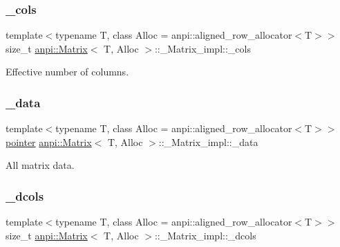 \subsubsection{\texorpdfstring{\+\_\+cols}{\_cols}}
{\footnotesize\ttfamily template$<$typename T, class Alloc = anpi\+::aligned\+\_\+row\+\_\+allocator$<$\+T$>$$>$ \\
size\+\_\+t \hyperlink{classanpi_1_1Matrix}{anpi\+::\+Matrix}$<$ T, Alloc $>$\+::\+\_\+\+Matrix\+\_\+impl\+::\+\_\+cols}



Effective number of columns. 

\mbox{\label{structanpi_1_1Matrix_1_1__Matrix__impl_ae23d12dd9622f7a0b608625265c60052}} 
\subsubsection{\texorpdfstring{\+\_\+data}{\_data}}
{\footnotesize\ttfamily template$<$typename T, class Alloc = anpi\+::aligned\+\_\+row\+\_\+allocator$<$\+T$>$$>$ \\
\hyperlink{classanpi_1_1Matrix_a6d2754ddec71081f6e1c0e4c320e8f8e}{pointer} \hyperlink{classanpi_1_1Matrix}{anpi\+::\+Matrix}$<$ T, Alloc $>$\+::\+\_\+\+Matrix\+\_\+impl\+::\+\_\+data}



All matrix data. 

\mbox{\label{structanpi_1_1Matrix_1_1__Matrix__impl_ae39deaa80d98414407f4c567b93e535d}} 
\subsubsection{\texorpdfstring{\+\_\+dcols}{\_dcols}}
{\footnotesize\ttfamily template$<$typename T, class Alloc = anpi\+::aligned\+\_\+row\+\_\+allocator$<$\+T$>$$>$ \\
size\+\_\+t \hyperlink{classanpi_1_1Matrix}{anpi\+::\+Matrix}$<$ T, Alloc $>$\+::\+\_\+\+Matrix\+\_\+impl\+::\+\_\+dcols}



